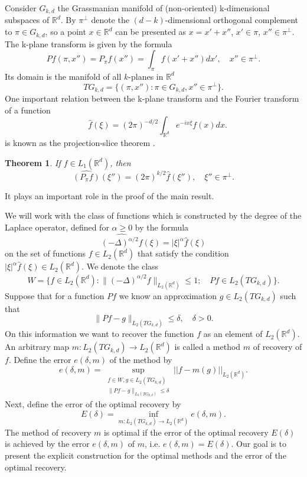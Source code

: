 \documentclass[12pt]{iopart}
\newtheorem{theorem}{Theorem}
\begin{document}
Consider $G_{k,d}$ the Grassmanian manifold of (non-oriented) k-dimensional subspaces of $\mathbb R^d$.
By $\pi^\perp$ denote the $(d-k)$-dimensional orthogonal complement to $\pi\in G_{k,d}$, so a point $x\in\mathbb R^d$ can be presented as $x=x'+x''$, $x'\in\pi$, $x''\in\pi^\perp$. The k-plane transform is given by the formula
	$$Pf(\pi,x'')=P_\pi f(x'')=\int_{\pi}f(x'+x'')dx',\quad x''\in\pi^\perp.$$
Its domain is the manifold of all $k$-planes in $\mathbb R^d$ 
$$TG_{k,d}=\{(\pi,x''):\pi\in G_{k,d}, x''\in\pi^\perp\}.$$
One important relation between the k-plane transform and the Fourier transform of a function
$$\quad \widehat f(\xi)=(2\pi)^{-d/2}\int_{\mathbb R^d}e^{-ix\xi}f(x)dx.$$
is  known as the projection-slice theorem \cite{K}. 

\begin{theorem}
\label{projection}
If $f\in L_1(\mathbb R^d)$, then
$$\widehat{(P_\pi f)}(\xi'')=(2\pi)^{k/2}\widehat f(\xi''),\quad \xi''\in\pi^\perp.$$
\end{theorem}
It plays an important role in the proof of the main result. 

We will work with the class of functions which is constructed by the degree of the Laplace operator, defined for $\alpha\ge 0$ by the formula 
$$\widehat{(-\Delta)^{\alpha/2}f}(\xi)=|\xi|^\alpha \widehat f(\xi)$$ on the set of functions $f\in L_2(\mathbb R^d)$ that satisfy the condition $|\xi|^\alpha\widehat f(\xi)\in L_2(\mathbb R^d)$.
We denote the class 
$$ W=\{f\in L_2(\mathbb R^d) :
\|(-\Delta)^{\alpha/2}f\|_{L_2(\mathbb R^d)}\leqslant  1;\quad Pf\in L_2(TG_{k,d}) \}.  $$
Suppose that for a function $Pf$ we know an approximation $g\in L_2(TG_{k,d})$ such that
	$$\|Pf-g\|_{L_2(TG_{k,d})}\le\delta, \quad\delta>0.$$
On this information we want to recover the function $f$ as an element of $ L_2(\mathbb R^d)$. An arbitrary map $m:L_2(TG_{k,d})\rightarrow L_2(\mathbb R^d)$ is called a method $m$ of recovery of $f$. Define the error $e(\delta,m)$ of the method by
\[
  e(\delta,m)=\sup_{
  \begin{smallmatrix}
f\in W, g\in L_2(TG_{k,d})\\ 
\|Pf-g\|_{L_2(TG_{k,d})}\leqslant \delta
\end{smallmatrix}} ||f-m(g)||_{L_2(\mathbb R^d)}.
\] 
Next, define the error of the optimal recovery by
\begin{equation}
\label{opter}
E(\delta)=\inf_{m:L_2(TG_{k,d})\rightarrow L_2(\mathbb R^d)}e(\delta,m).
\end{equation}
The method of recovery $m$ is optimal if the error of the optimal recovery $E(\delta)$ is achieved by the error $e(\delta,m)$ of $m$, i.e. $e(\delta,m)=E(\delta)$. Our goal is to present the explicit construction for the optimal methods and the error of the optimal recovery.
\end{document}
